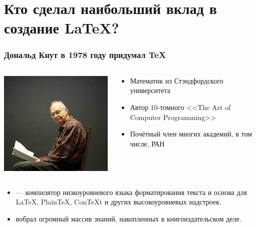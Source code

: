 \documentclass[10pt,pdf,hyperref={unicode}]{beamer}
\begin{document}
\section{Кто сделал наибольший вклад в создание \LaTeX{}? }
\begin{frame}
\frametitle{Дональд Кнут в 1978 году придумал \TeX}
    \begin{columns}[c]
    \begin{column}{0.5\textwidth}
       \includegraphics[keepaspectratio,height=0.5\textheight]{knuth.jpg}
    \end{column}
    \begin{column}{0.5\textwidth}
    \begin{itemize}
        \item Математик из Стэндфордского университета
        \item Автор 10-томного  <<The Art of Computer Programming>>
        \item Почётный член многих академий, в том числе, РАН
    \end{itemize}
    \end{column}
  \end{columns}
  \vfill
    \begin{itemize}
        \item[\TeX{}] --- компилятор низкоуровневого языка форматирования текста  и основа для \LaTeX{},  Plain\TeX{}, Con\TeX{}t и других высокоуровневых  надстроек.
        \item[\TeX{}] вобрал огромный массив знаний, накопленных в книгоиздательском деле.
    \end{itemize}
\end{frame}
\end{document}
